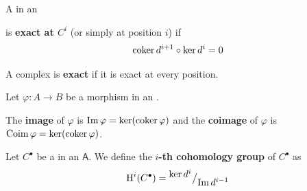 \documentclass[../main.tex]{subfiles}
\begin{document}
\begin{definition} \label{def:exact-complex}
  A  in an 
  \begin{center}
  \end{center}
  is \textbf{exact at \(C^{i}\)} (or simply at position \(i\)) if
  \begin{equation*}
    \operatorname*{coker} d^{i+1} \circ \ker d^{i} = 0
  \end{equation*}

  A complex is \textbf{exact} if it is exact at every position.
\end{definition}

\begin{definition} \label{def:image}
  Let \(\varphi: A \to B\) be a morphism in an .

  The \textbf{image} of \(\varphi\) is \(\operatorname*{Im} \varphi = \ker(\operatorname*{coker} \varphi)\) and the \textbf{coimage} of \(\varphi\) is \(\operatorname*{Coim} \varphi = \ker(\operatorname*{coker} \varphi)\).
\end{definition}


\begin{definition} \label{def:cohomology}
  Let \(C^{\bullet}\) be a  in an  \(\mathsf{A}\).
  We define the \textbf{\(i\)-th cohomology group} of \(C^{\bullet}\) as
  \begin{equation*}
    \operatorname{H}^{i}(C^{\bullet}) = {^{\textstyle \ker d^{i}}\big/_{\textstyle \operatorname*{Im} d^{i-1}}}
  \end{equation*}
\end{definition}
\end{document}
